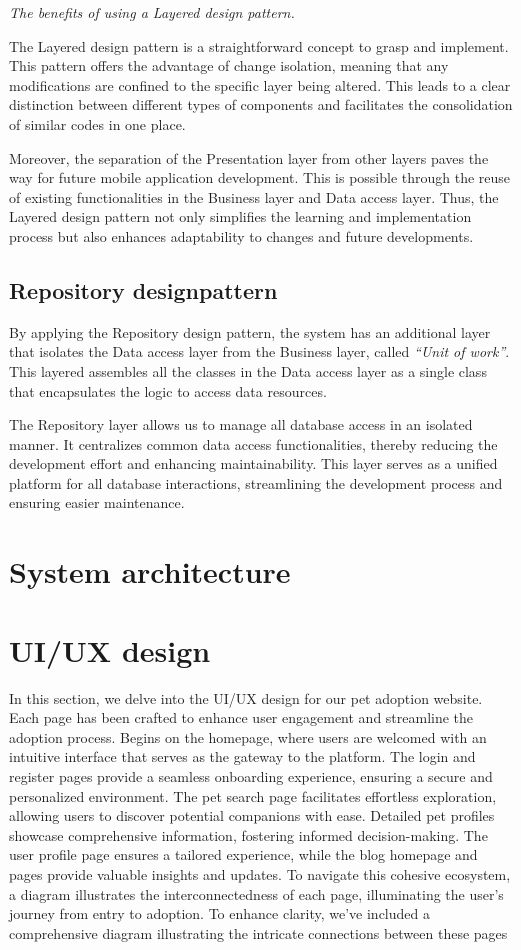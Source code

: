 \emph{The benefits of using a Layered design pattern.}

The Layered design pattern is a straightforward concept to grasp and
implement. This pattern offers the advantage of change isolation,
meaning that any modifications are confined to the specific layer being
altered. This leads to a clear distinction between different types of
components and facilitates the consolidation of similar codes in one
place.

Moreover, the separation of the Presentation layer from other layers
paves the way for future mobile application development. This is
possible through the reuse of existing functionalities in the Business
layer and Data access layer. Thus, the Layered design pattern not only
simplifies the learning and implementation process but also enhances
adaptability to changes and future developments.


\subsection{Repository designpattern}

By applying the Repository design pattern, the system has an additional
layer that isolates the Data access layer from the Business layer,
called \emph{``Unit of work''}. This layered assembles all the classes
in the Data access layer as a single class that encapsulates the logic
to access data resources.

The Repository layer allows us to manage all database access in an
isolated manner. It centralizes common data access functionalities,
thereby reducing the development effort and enhancing maintainability.
This layer serves as a unified platform for all database interactions,
streamlining the development process and ensuring easier maintenance.


\section{System architecture}

\section{UI/UX design}

In this section, we delve into the UI/UX design for our pet adoption website. Each page has been crafted to enhance user engagement and streamline the adoption process. Begins on the homepage, where users are welcomed with an intuitive interface that serves as the gateway to the platform. The login and register pages provide a seamless onboarding experience, ensuring a secure and personalized environment. The pet search page facilitates effortless exploration, allowing users to discover potential companions with ease. Detailed pet profiles showcase comprehensive information, fostering informed decision-making. The user profile page ensures a tailored experience, while the blog homepage and pages provide valuable insights and updates. To navigate this cohesive ecosystem, a diagram illustrates the interconnectedness of each page, illuminating the user's journey from entry to adoption. To enhance clarity, we've included a comprehensive diagram illustrating the intricate connections between these pages
